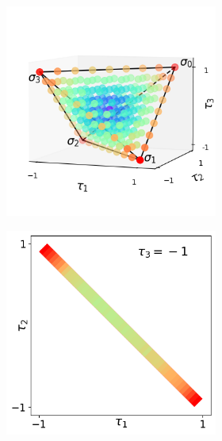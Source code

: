 \documentclass[10pt,letterpaper]{article} %
\begin{document}
\begin{figure} %
\centering
\begin{subfigure}{0.9\textwidth}
\begin{subfigure}{.666\textwidth}
\centering
\includegraphics[width=.95\columnwidth]{images/tetra-def.png}
\end{subfigure}%
\begin{subfigure}{.333\textwidth}
\includegraphics[width=.95\columnwidth]{images/corte1-2.png} \\

\end{subfigure}
\end{subfigure}
\end{figure}
\end{document}
